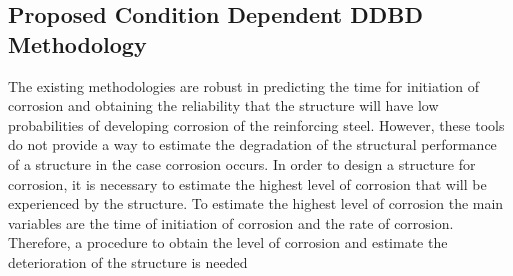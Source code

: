 \subsection{Proposed Condition Dependent DDBD Methodology}

The existing methodologies are robust in predicting the time for initiation of corrosion and obtaining the reliability that the structure will have low probabilities of developing corrosion of the reinforcing steel. However, these tools do not provide a way to estimate the degradation of the structural performance of a structure in the case corrosion occurs. In order to design a structure for corrosion, it is necessary to estimate the highest level of corrosion that will be experienced by the structure. To estimate the highest level of corrosion the main variables are the time of initiation of corrosion and the rate of corrosion. Therefore, a procedure to obtain the level of corrosion and estimate the deterioration of the structure is needed


